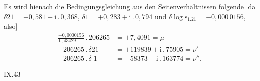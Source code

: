 Es wird hienach die Bedingungsgleichung aus den Seitenverhältnissen folgende [da \(\delta21=-0{,}581-\mathrm{i}\,.\,0{,}368\), \(\delta1=+0{,}283+\mathrm{i}\,.\,0{,}794\) und \(\delta\log\mathrm{s}_{1.21}=-0{,}000\,0156\), also]
\[
\begin{aligned}
\frac{+0{,}0000156}{0{,}43429\ .\ .\ .}\,.\,206265&=+7{,}4091=\mu\\[4pt]
-206265\,.\,\delta21&=+119839+\mathrm{i}\,.\,75905=\nu'\\[4pt]
-206265\,.\,\delta\;1&=-58373-\mathrm{i}\,.\,163774=\nu''.
\end{aligned}
\]
\noindent[ist:]
\par\vfill\noindent\small IX.\hfill43\normalsize
\clearpage
\noindent{}%
%
\makebox[12mm][r]{}\par\nobreak\medskip
\begingroup
\small\setlength{\tabcolsep}{5pt}\renewcommand{\arraystretch}{1.18}
